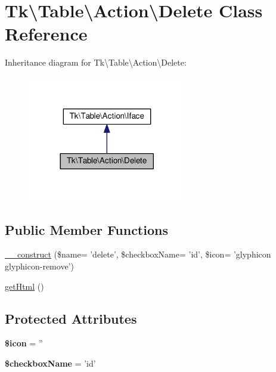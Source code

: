 \hypertarget{classTk_1_1Table_1_1Action_1_1Delete}{\section{Tk\textbackslash{}Table\textbackslash{}Action\textbackslash{}Delete Class Reference}
\label{classTk_1_1Table_1_1Action_1_1Delete}
}


Inheritance diagram for Tk\textbackslash{}Table\textbackslash{}Action\textbackslash{}Delete\+:\nopagebreak
\begin{figure}[H]
\begin{center}
\leavevmode
\includegraphics[width=197pt]{classTk_1_1Table_1_1Action_1_1Delete__inherit__graph}
\end{center}
\end{figure}
\subsection*{Public Member Functions}
\begin{DoxyCompactItemize}
\item 
\hyperlink{classTk_1_1Table_1_1Action_1_1Delete_ad377d0f8fcd9dcf04a4982ab9ab74c07}{\+\_\+\+\_\+construct} (\$name= 'delete', \$checkbox\+Name= 'id', \$icon= 'glyphicon glyphicon-\/remove')
\item 
\hyperlink{classTk_1_1Table_1_1Action_1_1Delete_a72e574c6ae07ae2f7441f5273b2420c2}{get\+Html} ()
\end{DoxyCompactItemize}
\subsection*{Protected Attributes}
\begin{DoxyCompactItemize}
\item 
\hypertarget{classTk_1_1Table_1_1Action_1_1Delete_a3cd8c0ecf53f518caf596616d5080334}{{\bfseries \$icon} = ''}\label{classTk_1_1Table_1_1Action_1_1Delete_a3cd8c0ecf53f518caf596616d5080334}

\item 
\hypertarget{classTk_1_1Table_1_1Action_1_1Delete_a956c5bd1dfb444359beee796530e4ce9}{{\bfseries \$checkbox\+Name} = 'id'}\label{classTk_1_1Table_1_1Action_1_1Delete_a956c5bd1dfb444359beee796530e4ce9}

\end{DoxyCompactItemize}


